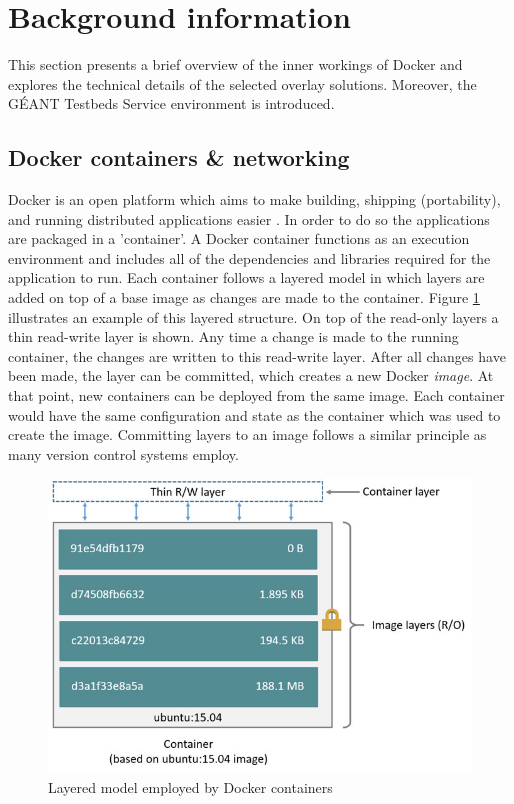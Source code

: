 \section{Background information} \label{background}
This section presents a brief overview of the inner workings of Docker and explores the technical details of the selected overlay solutions. Moreover, the GÉANT Testbeds Service environment is introduced.  

\subsection{Docker containers \& networking}
Docker is an open platform which aims to make building, shipping (portability), and running distributed applications easier \cite{docker2015}. In order to do so the applications are packaged in a 'container'. A Docker container functions as an execution environment and includes all of the dependencies and libraries required for the application to run. Each container follows a layered model in which layers are added on top of a base image as changes are made to the container. Figure \ref{fig:docker_layers} illustrates an example of this layered structure. On top of the read-only layers a thin read-write layer is shown. Any time a change is made to the running container, the changes are written to this read-write layer. After all changes have been made, the layer can be committed, which creates a new Docker \textit{image}. At that point, new containers can be deployed from the same image. Each container would have the same configuration and state as the container which was used to create the image. Committing layers to an image follows a similar principle as many version control systems employ. 

\begin{figure}[!ht]
   \centering
   \includegraphics[scale=0.6]{img/container-layers.jpg}
   \caption{Layered model employed by Docker containers \cite{docker2015}}
   \label{fig:docker_layers}
\end{figure}


